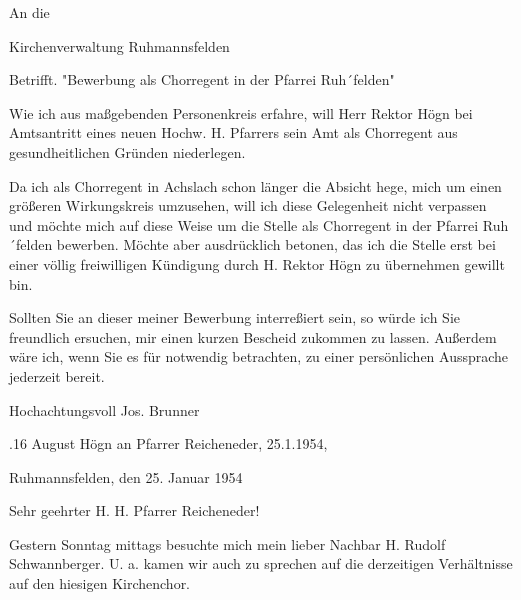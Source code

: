 An die

Kirchenverwaltung Ruhmannsfelden



Betrifft. "Bewerbung als Chorregent in der Pfarrei Ruh´felden"



Wie ich aus maßgebenden Personenkreis erfahre, will Herr Rektor Högn bei
Amtsantritt eines neuen Hochw. H. Pfarrers sein Amt als Chorregent aus
gesundheitlichen Gründen niederlegen.

Da ich als Chorregent in Achslach schon länger die Absicht hege, mich um einen
größeren Wirkungskreis umzusehen, will ich diese Gelegenheit nicht verpassen und
möchte mich auf diese Weise um die Stelle als Chorregent in der Pfarrei
Ruh´felden bewerben. Möchte aber ausdrücklich betonen, das ich die Stelle erst
bei einer völlig freiwilligen Kündigung durch H. Rektor Högn zu übernehmen
gewillt bin.

Sollten Sie an dieser meiner Bewerbung interreßiert sein, so würde ich Sie
freundlich ersuchen, mir einen kurzen Bescheid zukommen zu lassen. Außerdem wäre
ich, wenn Sie es für notwendig betrachten, zu einer persönlichen Aussprache
jederzeit bereit.



Hochachtungsvoll Jos. Brunner

.16 August Högn an Pfarrer Reicheneder, 25.1.1954,

Ruhmannsfelden, den 25. Januar 1954



Sehr geehrter H. H. Pfarrer Reicheneder!



Gestern Sonntag mittags besuchte mich mein lieber Nachbar H. Rudolf
Schwannberger. U. a. kamen wir auch zu sprechen auf die derzeitigen Verhältnisse
auf den hiesigen Kirchenchor.


